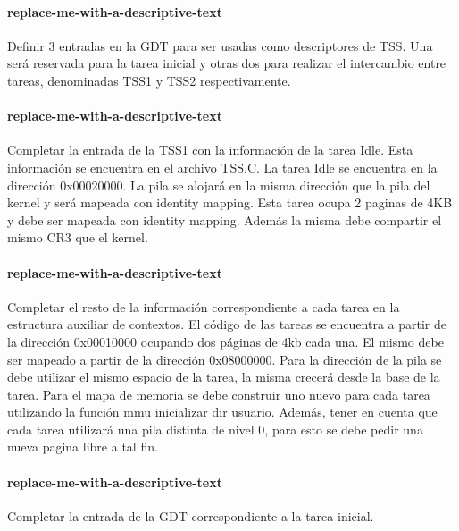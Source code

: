 \paragraph{replace-me-with-a-descriptive-text}\label{subsubsec:ej6-a}
Definir 3 entradas en la GDT para ser usadas como descriptores de TSS. Una será
reservada para la tarea inicial y otras dos para realizar el intercambio entre
tareas, denominadas TSS1 y TSS2 respectivamente.
\hruler
{}

\paragraph{replace-me-with-a-descriptive-text}\label{subsubsec:ej6-b}
Completar la entrada de la TSS1 con la información de la tarea Idle. Esta
información se encuentra en el archivo TSS.C. La tarea Idle se encuentra en la
dirección 0x00020000. La pila se alojará en la misma dirección que la pila del
kernel y será mapeada con identity mapping. Esta tarea ocupa 2 paginas de 4KB y
debe ser mapeada con identity mapping. Además la misma debe compartir el mismo
CR3 que el kernel.
\hruler
{}

\paragraph{replace-me-with-a-descriptive-text}\label{subsubsec:ej6-c}
Completar el resto de la información correspondiente a cada tarea en la
estructura auxiliar de contextos. El código de las tareas se encuentra a partir
de la dirección 0x00010000 ocupando dos páginas de 4kb cada una. El mismo debe
ser mapeado a partir de la dirección 0x08000000. Para la dirección de la pila se
debe utilizar el mismo espacio de la tarea, la misma crecerá desde la base de la
tarea. Para el mapa de memoria se debe construir uno nuevo para cada tarea
utilizando la función mmu inicializar dir usuario. Además, tener en cuenta que
cada tarea utilizará una pila distinta de nivel 0, para esto se debe pedir una
nueva pagina libre a tal fin.
\hruler
{}

\paragraph{replace-me-with-a-descriptive-text}\label{subsubsec:ej6-d}
Completar la entrada de la GDT correspondiente a la tarea inicial.
\hruler
{}

